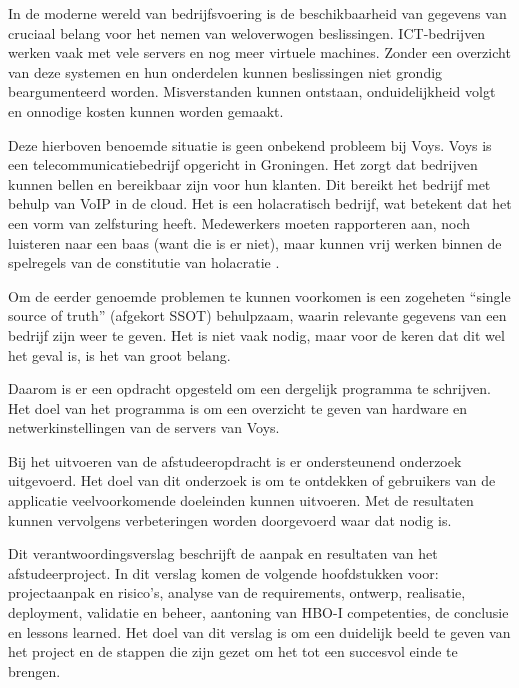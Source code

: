 \documentclass[../report.tex]{subfiles}
\begin{document}
In de moderne wereld van bedrijfsvoering is de beschikbaarheid van gegevens van cruciaal belang voor het nemen van weloverwogen beslissingen. ICT-bedrijven werken vaak met vele \glspl*{server} en nog meer virtuele machines. Zonder een overzicht van deze systemen en hun onderdelen kunnen beslissingen niet grondig beargumenteerd worden. Misverstanden kunnen ontstaan, onduidelijkheid volgt en onnodige kosten kunnen worden gemaakt.

Deze hierboven benoemde situatie is geen onbekend probleem bij Voys. Voys is een telecommunicatiebedrijf opgericht in Groningen. Het zorgt dat bedrijven kunnen bellen en bereikbaar zijn voor hun klanten. Dit bereikt het bedrijf met behulp van \gls*{VoIP} in de cloud. Het is een holacratisch bedrijf, wat betekent dat het een vorm van zelfsturing heeft. Medewerkers moeten rapporteren aan, noch luisteren naar een baas (want die is er niet), maar kunnen vrij werken binnen de spelregels van de \gls*{constitutie} van \gls*{holacratie} \parencite{holacracy}.

Om de eerder genoemde problemen te kunnen voorkomen is een zogeheten ``single source of truth'' (afgekort \gls*{SSOT}) behulpzaam, waarin relevante gegevens van een bedrijf zijn weer te geven. Het is niet vaak nodig, maar voor de keren dat dit wel het geval is, is het van groot belang.

Daarom is er een opdracht opgesteld om een dergelijk programma te schrijven. Het doel van het programma is om een overzicht te geven van hardware en netwerkinstellingen van de \glspl*{server} van Voys.

Bij het uitvoeren van de afstudeeropdracht is er ondersteunend onderzoek uitgevoerd. Het doel van dit onderzoek is om te ontdekken of gebruikers van de applicatie veelvoorkomende doeleinden kunnen uitvoeren. Met de resultaten kunnen vervolgens verbeteringen worden doorgevoerd waar dat nodig is.

Dit verantwoordingsverslag beschrijft de aanpak en resultaten van het afstudeerproject. In dit verslag komen de volgende hoofdstukken voor: projectaanpak en risico's, analyse van de requirements, ontwerp, realisatie, deployment, validatie en beheer, aantoning van HBO-I competenties, de conclusie en lessons learned. Het doel van dit verslag is om een duidelijk beeld te geven van het project en de stappen die zijn gezet om het tot een succesvol einde te brengen.
\end{document}
